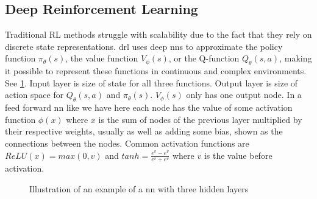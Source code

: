 \documentclass[UKenglish]{uiomasterthesis}
\begin{document}
\subsection{Deep Reinforcement Learning}
Traditional RL methods struggle with scalability due to the fact that they rely on discrete state representations. \ac{drl} uses deep \acp{nn} to approximate the policy function $\pi_\theta(s)$, the value function $V_\phi(s)$, or the Q-function $Q_\theta(s,a)$, making it possible to represent these functions in continuous and complex environments. See \cref{fig:neural_network}. Input layer is size of state for all three functions. Output layer is size of action space for $Q_\theta(s,a)$ and $\pi_\theta(s)$. $V_\phi(s)$ only has one output node. In a feed forward \ac{nn} like we have here each node has the value of some activation function $\phi(x)$ where $x$ is the sum of nodes of the previous layer multiplied by their respective weights, usually as well as adding some bias, shown as the connections between the nodes. Common activation functions are $ReLU(x) = max(0,v)$ and $tanh=\frac{e^v-e^v}{e^v+e^v}$ where $v$ is the value before activation.
\begin{figure}[hbtp]
    \centering
    \caption{Illustration of an example of a \ac{nn} with three hidden layers}
    \label{fig:neural_network}
\end{figure}
\end{document}
